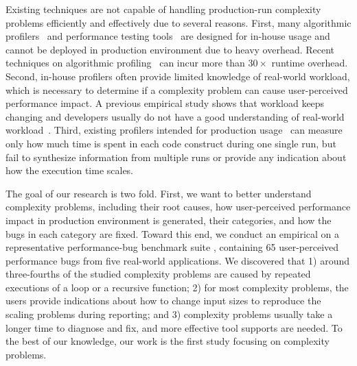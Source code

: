 Existing techniques
are not capable of handling production-run complexity problems
efficiently and effectively due to several reasons. 
First, many algorithmic profilers~\cite{Aprof1,Aprof2,AlgoProf} and performance 
testing tools~\cite{Alabama,PerfBlower} are designed for in-house usage and cannot be 
deployed in production environment due to heavy overhead. 
Recent techniques on algorithmic 
profiling~\cite{Aprof1,Aprof2,AlgoProf} can incur more than $30\times$ runtime overhead.
Second, in-house profilers often  provide limited knowledge of real-world workload, which is necessary 
to determine if a complexity problem can cause user-perceived performance 
impact. A previous empirical study shows that workload keeps changing and 
developers usually do not have a good understanding of real-world workload~\citep{PerfBug}.  
Third, existing profilers intended for production usage~\cite{gprof,oprofile,LagHunter,IntroPerf}
can measure only how much time 
is spent in each code construct during one single run,
but fail to synthesize information from multiple runs
or provide any indication about how the execution time scales.


%
The goal of our research is two fold. First, we want to better 
understand  complexity problems, including 
their root causes, how user-perceived performance impact 
in production environment is generated,
their categories, 
and how the bugs in each category are
fixed.  Toward this end, 
we conduct an empirical on a representative
performance-bug benchmark suite \cite{PerfBug,SongOOPSLA2014},
containing 65 user-perceived  performance bugs from five
real-world applications.  We discovered that 
1) around three-fourths of the studied complexity problems are
caused by repeated executions of a loop or a recursive function;
2) for most complexity problems,
the users provide indications about 
how to change input sizes to reproduce the scaling problems during reporting;
and 3) complexity problems usually take a longer time to diagnose and fix,
and more effective tool supports are needed. 
To the best of our knowledge, our work is the first study focusing on complexity problems.



